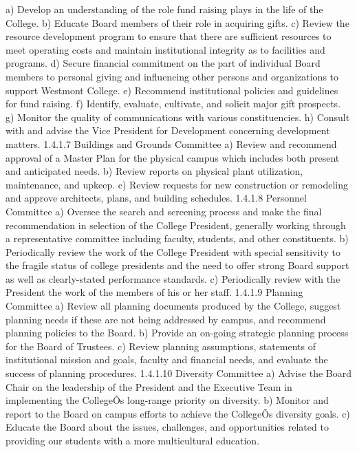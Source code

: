 \documentclass[letterpaper, 11pt]{article}
\begin{document}
			a) Develop an understanding of the role fund raising plays in the life of the College.
			b) Educate Board members of their role in acquiring gifts.
			c) Review the resource development program to ensure that there are sufficient resources to meet operating costs and maintain institutional integrity as to facilities and programs.
			d) Secure financial commitment on the part of individual Board members to personal giving and influencing other persons and organizations to support Westmont College.
			e) Recommend institutional policies and guidelines for fund raising.
			f) Identify, evaluate, cultivate, and solicit major gift prospects.
			g) Monitor the quality of communications with various constituencies.
			h) Consult with and advise the Vice President for Development concerning development matters.
			1.4.1.7 Buildings and Grounds Committee
			a) Review and recommend approval of a Master Plan for the physical campus which includes both present and anticipated needs.
			b) Review reports on physical plant utilization, maintenance, and upkeep.
			c) Review requests for new construction or remodeling and approve architects, plans, and building schedules.
			1.4.1.8 Personnel Committee
			a) Oversee the search and screening process and make the final recommendation in selection of the College President, generally working through a representative committee including faculty, students, and other constituents.
			b) Periodically review the work of the College President with special sensitivity to the fragile status of college presidents and the need to offer strong Board support as well as clearly-stated performance standards.
			c) Periodically review with the President the work of the members of his or her staff.
			1.4.1.9 Planning Committee
			a) Review all planning documents produced by the College, suggest planning needs if these are not being addressed by campus, and recommend planning policies to the Board.
			b) Provide an on-going strategic planning process for the Board of Trustees.
			c) Review planning assumptions, statements of institutional mission and goals, faculty and financial needs, and evaluate the success of planning procedures.
			1.4.1.10 Diversity Committee
			a) Advise the Board Chair on the leadership of the President and the Executive Team in implementing the CollegeÕs long-range priority on diversity.
			b) Monitor and report to the Board on campus efforts to achieve the CollegeÕs diversity goals.
			c) Educate the Board about the issues, challenges, and opportunities related to providing our students with a more multicultural education.
\end{document}
